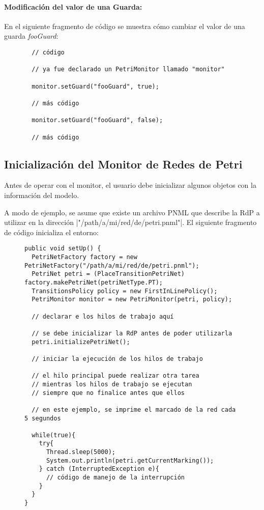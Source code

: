 \paragraph{Modificación del valor de una Guarda:} En el siguiente fragmento de
código se muestra cómo cambiar el valor de una guarda \textit{fooGuard}:

\begin{figure}[H]
\centering
\begin{verbatim}
  // código
  
  // ya fue declarado un PetriMonitor llamado "monitor"
  
  monitor.setGuard("fooGuard", true);
  
  // más código
  
  monitor.setGuard("fooGuard", false);
  
  // más código
\end{verbatim}
\end{figure}

\subsection{Inicialización del Monitor de Redes de Petri}

Antes de operar con el monitor, el usuario debe inicializar algunos
objetos con la información del modelo.

A modo de ejemplo, se asume que existe un archivo PNML que describe la RdP a
utilizar en la dirección |"/path/a/mi/red/de/petri.pnml"|. El
siguiente fragmento de código inicializa  el entorno:

\begin{figure}[H]
\centering
\begin{verbatim}
public void setUp() {
  PetriNetFactory factory = new PetriNetFactory("/path/a/mi/red/de/petri.pnml");
  PetriNet petri = (PlaceTransitionPetriNet) factory.makePetriNet(petriNetType.PT);
  TransitionsPolicy policy = new FirstInLinePolicy();
  PetriMonitor monitor = new PetriMonitor(petri, policy);
  
  // declarar e los hilos de trabajo aquí
  
  // se debe inicializar la RdP antes de poder utilizarla
  petri.initializePetriNet();
  
  // iniciar la ejecución de los hilos de trabajo
  
  // el hilo principal puede realizar otra tarea
  // mientras los hilos de trabajo se ejecutan
  // siempre que no finalice antes que ellos
  
  // en este ejemplo, se imprime el marcado de la red cada 5 segundos
  
  while(true){
    try{
      Thread.sleep(5000);
      System.out.println(petri.getCurrentMarking());
    } catch (InterruptedException e){
      // código de manejo de la interrupción
    }
  }
}
\end{verbatim}
\end{figure}

